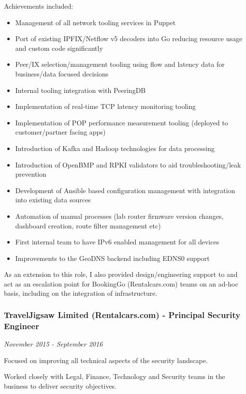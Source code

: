 Achievements included:

\begin{itemize}
\itemsep1pt\parskip0pt
\item
  Management of all network tooling services in Puppet
\item
  Port of existing IPFIX/Netflow v5 decoders into Go reducing resource
  usage and custom code significantly
\item
  Peer/IX selection/management tooling using flow and latency data for
  business/data focused decisions
\item
  Internal tooling integration with PeeringDB
\item
  Implementation of real-time TCP latency monitoring tooling
\item
  Implementation of POP performance measurement tooling (deployed to
  customer/partner facing apps)
\item
  Introduction of Kafka and Hadoop technologies for data processing
\item
  Introduction of OpenBMP and RPKI validators to aid
  troubleshooting/leak prevention
\item
  Development of Ansible based configuration management with integration
  into existing data sources
\item
  Automation of manual processes (lab router firmware version changes,
  dashboard creation, route filter management etc)
\item
  First internal team to have IPv6 enabled management for all devices
\item
  Improvements to the GeoDNS backend including EDNS0 support
\end{itemize}

As an extension to this role, I also provided design/engineering support
to and act as an escalation point for BookingGo (Rentalcars.com) teams
on an ad-hoc basis, including on the integration of infrastructure.

\subsubsection{TravelJigsaw Limited (Rentalcars.com) - Principal
Security
Engineer}\label{traveljigsaw-limited-rentalcars.com---principal-security-engineer}

\emph{November 2015 - September 2016}

Focused on improving all technical aspects of the security landscape.

Worked closely with Legal, Finance, Technology and Security teams in the
business to deliver security objectives.

